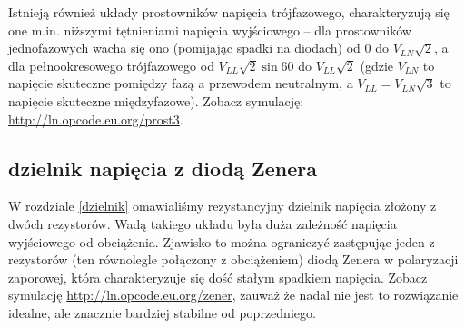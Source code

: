 \documentclass{pdfBooklets}
\begin{document}
Istnieją również układy prostowników napięcia trójfazowego, charakteryzują się one m.in. niższymi tętnieniami napięcia wyjściowego – dla prostowników jednofazowych wacha się ono (pomijając spadki na diodach) od $0$ do $V_{LN}\sqrt{2}$, a dla pełnookresowego trójfazowego od $V_{LL}\sqrt{2}\sin{60}$ do $V_{LL}\sqrt{2}$ (gdzie $V_{LN}$ to napięcie skuteczne pomiędzy fazą a przewodem neutralnym, a $V_{LL} = V_{LN}\sqrt{3}$ to napięcie skuteczne międzyfazowe). Zobacz symulację: \url{http://ln.opcode.eu.org/prost3}.

\subsection{dzielnik napięcia z diodą Zenera}

W rozdziale \ref{dzielnik} omawialiśmy rezystancyjny dzielnik napięcia złożony z dwóch rezystorów. Wadą takiego układu była duża zależność napięcia wyjściowego od obciążenia. Zjawisko to można ograniczyć zastępując jeden z rezystorów (ten równolegle połączony z obciążeniem) diodą Zenera w polaryzacji zaporowej, która charakteryzuje się dość stałym spadkiem napięcia. Zobacz symulację \url{http://ln.opcode.eu.org/zener}, zauważ że nadal nie jest to rozwiązanie idealne, ale znacznie bardziej stabilne od poprzedniego.
\end{document}
